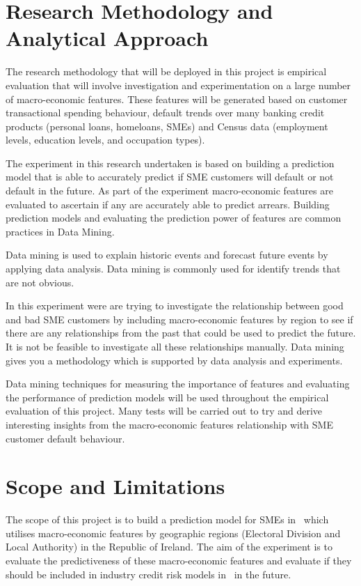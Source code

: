 \section{Research Methodology and Analytical Approach}

The research methodology that will be deployed in this project is empirical evaluation that will involve investigation and experimentation on a large number of macro-economic features. These features will be generated based on customer transactional spending behaviour, default trends over many banking credit products (personal loans, homeloans, SMEs) and Census data (employment levels, education levels, and occupation types).   

The experiment in this research undertaken is based on building a prediction model that is able to accurately predict if SME customers will default or not default in the future. As part of the experiment macro-economic features are evaluated to ascertain if any are accurately able to predict arrears. Building prediction models and evaluating the prediction power of features are common practices in Data Mining.

Data mining is used to explain historic events and forecast future events by applying data analysis. Data mining is commonly used for identify trends that are not obvious. 

In this experiment were are trying to investigate the relationship between good and bad SME customers by including macro-economic features by region to see if there are any relationships from the past that could be used to predict the future. It is not be feasible to investigate all these relationships manually. Data mining gives you a methodology which is supported by data analysis and experiments. 

Data mining techniques for measuring the importance of features and evaluating the performance of prediction models will be used throughout the empirical evaluation of this project. Many tests will be carried out to try and derive interesting insights from the macro-economic features relationship with SME customer default behaviour.

\section{Scope and Limitations}
The scope of this project is to build a prediction model for SMEs in \subjectname\  which utilises macro-economic features by geographic regions (Electoral Division and Local Authority) in the Republic of Ireland. The aim of the experiment is to evaluate the predictiveness of these macro-economic features and evaluate if they should be included in industry credit risk models in \subjectname\ in the future.

